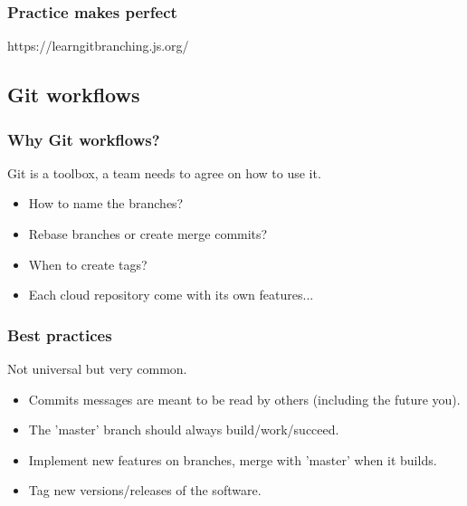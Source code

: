 \begin{frame}
\frametitle{Practice makes perfect}
   https://learngitbranching.js.org/
\end{frame}

\subsection{Git workflows}

\begin{frame}
\frametitle{Why Git workflows?}
   Git is a toolbox, a team needs to agree on how to use it.
   \begin{itemize}
      \item<1-> How to name the branches?
      \item<2-> Rebase branches or create merge commits?
      \item<3-> When to create tags?
      \item<4-> Each cloud repository come with its own features...
   \end{itemize}
\end{frame}

\begin{frame}
\frametitle{Best practices}
   Not universal but very common.
   \begin{itemize}
      \item Commits messages are meant to be read by others (including the future you).
      \item The 'master' branch should always build/work/succeed.
      \item Implement new features on branches, merge with 'master' when it builds.
      \item Tag new versions/releases of the software.
   \end{itemize}
\end{frame}

